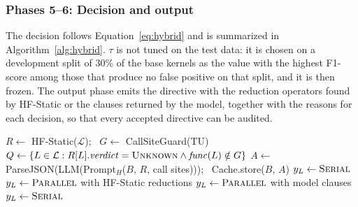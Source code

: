 \subsubsection{Phases 5--6: Decision and output}
The decision follows Equation~\eqref{eq:hybrid} and is summarized in Algorithm~\ref{alg:hybrid}. $\tau$ is not tuned on the test data: it is chosen on a development split of 30\% of the base kernels as the value with the highest F1-score among those that produce no false positive on that split, and it is then frozen. The output phase emits the directive with the reduction operators found by HF-Static or the clauses returned by the model, together with the reasons for each decision, so that every accepted directive can be audited.

\begin{algorithm}[htbp]
\caption{\SystemName{} decision for a translation unit}
\label{alg:hybrid}
\footnotesize
\begin{algorithmic}[1]
\STATE $R \leftarrow$ HF-Static($\mathcal{L}$); \ $G \leftarrow$ CallSiteGuard(TU)
\STATE $Q \leftarrow \{L \in \mathcal{L} : R[L].\mathit{verdict} = \textsc{Unknown} \wedge \mathit{func}(L) \notin G\}$
  \STATE $A \leftarrow$ ParseJSON(LLM(Prompt$_H$($B$, $R$, call sites))); \ Cache.store($B$, $A$)
\ENDFOR
{}
   \STATE $y_L \leftarrow \textsc{Serial}$ 
   \STATE $y_L \leftarrow \textsc{Parallel}$ with HF-Static reductions
   \STATE $y_L \leftarrow \textsc{Parallel}$ with model clauses
  \ELSE \STATE $y_L \leftarrow \textsc{Serial}$ 
  \ENDIF
\ENDFOR
\end{algorithmic}
\end{algorithm}
